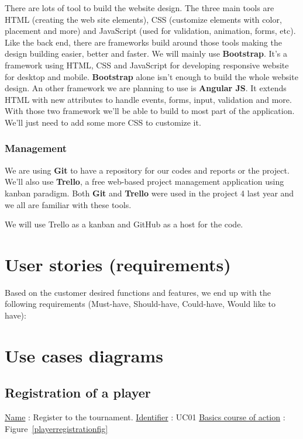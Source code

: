 There are lots of tool to build the website design. The three main tools are HTML (creating the web site elements), CSS (customize elements with color, placement and more) and JavaScript (used for validation, animation, forms, etc). Like the back end, there are frameworks build around those tools making the design building easier, better and faster. We will mainly use \textbf{Bootstrap}. It's a framework using HTML, CSS and JavaScript for developing responsive website for desktop and mobile. \textbf{Bootstrap} alone isn't enough to build the whole website design. An other framework we are planning to use is \textbf{Angular JS}. It extends HTML with new attributes to handle events, forms, input, validation and more. With those two framework we'll be able to build to most part of the application. We'll just need to add some more CSS to customize it.

\subsubsection{Management}

We are using \textbf{Git} to have a repository for our codes and reports or the project. We'll also use \textbf{Trello}, a free web-based project management application using kanban paradigm. Both \textbf{Git} and \textbf{Trello} were used in the project 4 last year and we all are familiar with these tools.

We will use Trello as a kanban and GitHub as a host for the code. \newline
\fi

\section{User stories (requirements)}
Based on the customer desired functions and features, we end up with the
following requirements (Must-have, Should-have, Could-have, Would like
to have):



\section{Use cases diagrams}
\subsection{Registration of a player}

\noindent \underline{Name} : Register to the tournament. \newline
\underline{Identifier} : UC01 \newline
\underline{Basics course of action} : Figure~\ref{playerregistrationfig} \newline

